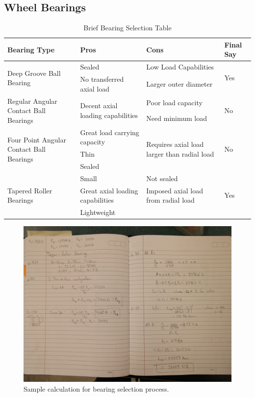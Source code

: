 \subsection{Wheel Bearings}\label{sec:ws_bearing}

\begin{table}[htbp]
	\centering
	\caption{Brief Bearing Selection Table}
	\begin{tabular}{| p{4cm}p{4cm}p{4cm}l |} \hline
		Bearing Type & Pros & Cons & Final Say \\ \hline
		\multirow{2}{4cm}{Deep Groove Ball Bearing} & Sealed & Low Load Capabilities & \multirow{2}{*}{Yes} \\
		& No transferred axial load & Larger outer diameter & \\ \hline
		\multirow{2}{4cm}{Regular Angular Contact Ball Bearings} & \multirow{2}{4cm}{Decent axial loading capabilities} & Poor load capacity & \multirow{2}{*}{No} \\
		& & Need minimum load & \\ \hline
		\multirow{3}{4cm}{Four Point Angular Contact Ball Bearings} & Great load carrying capacity & \multirow{3}{4cm}{Requires axial load larger than radial load} & \multirow{3}{*}{No} \\
		& Thin & & \\
		& Sealed & & \\ \hline
		\multirow{3}{4cm}{Tapered Roller Bearings} & Small & Not sealed & \multirow{3}{*}{Yes} \\
		& Great axial loading capabilities & Imposed axial load from radial load & \\
		& Lightweight & & \\ \hline
	\end{tabular}
	\label{tab:bearing_selection}
\end{table}

\begin{figure}[H]
	\centering
	\includegraphics[width=\textwidth]{dom/bearing_selection_calc.jpg}
	\caption{Sample calculation for bearing selection process.}
	\label{fig:bearing_calc}
\end{figure}

